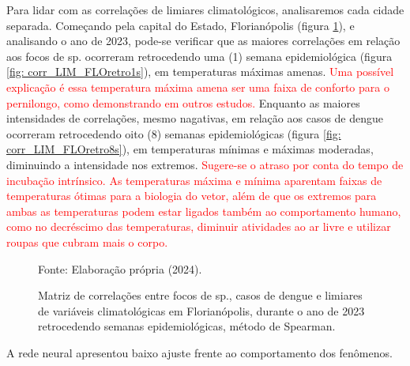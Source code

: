 \documentclass[
	12pt,				%
	openright,			%
	oneside,			%
	a4paper,			%
	english,			%
	french,				%
	spanish,			%
	brazil				%
	dvipsnames, table]{abntex2}
\begin{document}
\indent Para lidar com as correlações de limiares climatológicos, analisaremos cada cidade separada. Começando pela capital do Estado, Florianópolis (figura \ref{fig: matriz_corr_LIM_FLOretro}), e analisando o ano de 2023, pode-se verificar que as maiores correlações em relação aos focos de  sp. ocorreram retrocedendo uma (1) semana epidemiológica (figura \ref{fig: corr_LIM_FLOretro1s}), em temperaturas máximas amenas. \textcolor{red}{Uma possível explicação é essa temperatura máxima amena ser uma faixa de conforto para o pernilongo, como demonstrando em outros estudos.} Enquanto as maiores intensidades de correlações, mesmo nagativas, em relação aos casos de dengue ocorreram retrocedendo oito (8) semanas epidemiológicas (figura \ref{fig: corr_LIM_FLOretro8s}), em temperaturas mínimas e máximas moderadas, diminuindo a intensidade nos extremos. \textcolor{red}{Sugere-se o atraso por conta do tempo de incubação intrínsico. As temperaturas máxima e mínima aparentam faixas de temperaturas ótimas para a biologia do vetor, além de que os extremos para ambas as temperaturas podem estar ligados também ao comportamento humano, como no decréscimo das temperaturas, diminuir atividades ao ar livre e utilizar roupas que cubram mais o corpo.}

\begin{figure}[htbp]
    \begin{center}
    \caption{Matriz de correlações entre focos de  sp., casos de dengue e limiares de variáveis climatológicas em Florianópolis, durante o ano de 2023 retrocedendo semanas epidemiológicas, método de Spearman.}
    \label{fig: matriz_corr_LIM_FLOretro}
        \hfill
    \end{center}
    \small{Fonte: Elaboração própria (2024).}
\end{figure}



\newpage

\indent A rede neural apresentou baixo ajuste frente ao comportamento dos fenômenos.
\end{document}
